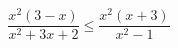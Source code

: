 \documentclass{article}
\begin{document}
\[ \frac{x^2(3-x)}{x^2+3x+2} \le \frac{x^2(x+3)}{x^2-1} \]
\end{document}
